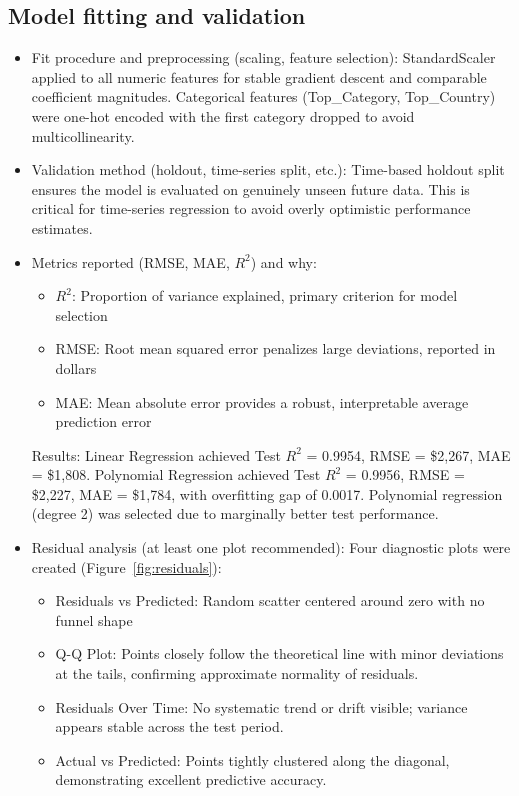 \documentclass[11pt]{article}
\begin{document}
\subsection{Model fitting and validation}
\begin{itemize}[leftmargin=*]
    \item Fit procedure and preprocessing (scaling, feature selection): StandardScaler applied 
    to all numeric features for stable gradient descent and comparable coefficient magnitudes. 
    Categorical features (Top\_Category, Top\_Country) were one-hot encoded with the first 
    category dropped to avoid multicollinearity.
    \item Validation method (holdout, time-series split, etc.): Time-based holdout split
    ensures the model is evaluated on genuinely unseen future data. This is critical for 
    time-series regression to avoid overly optimistic performance estimates.
    \item Metrics reported (RMSE, MAE, $R^2$) and why:
    \begin{itemize}
        \item $R^2$: Proportion of variance explained, primary criterion for model selection
        \item RMSE: Root mean squared error penalizes large deviations, reported in dollars
        \item MAE: Mean absolute error provides a robust, interpretable average prediction error
    \end{itemize}
    Results: Linear Regression achieved Test $R^2$ = 0.9954, RMSE = \$2,267, MAE = \$1,808.
    Polynomial Regression achieved Test $R^2$ = 0.9956, RMSE = \$2,227, MAE = \$1,784, with overfitting gap of 0.0017.
    Polynomial regression (degree 2) was selected due to marginally better test performance.
    \item Residual analysis (at least one plot recommended): Four diagnostic plots were created (Figure~\ref{fig:residuals}):
    \begin{itemize}
        \item Residuals vs Predicted: Random scatter centered around zero with no funnel shape
        \item Q-Q Plot: Points closely follow the theoretical line with minor deviations 
        at the tails, confirming approximate normality of residuals.
        \item Residuals Over Time: No systematic trend or drift visible; variance appears 
        stable across the test period.
        \item Actual vs Predicted: Points tightly clustered along the diagonal, 
        demonstrating excellent predictive accuracy.
    \end{itemize}
\end{itemize}
\end{document}
